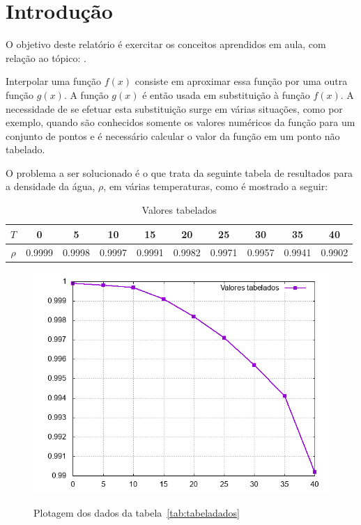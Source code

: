 \documentclass[12pt, hidelinks]{article}
\makeatletter
\let\thetitle\@title
\makeatother
\begin{document}
\section{Introdução}

O objetivo deste relatório é exercitar os conceitos aprendidos em aula, com relação ao tópico: \thetitle.

Interpolar uma função $f(x)$ consiste em aproximar essa função por uma outra função $g(x)$. A função $g(x)$
é então usada em substituição à função $f(x)$.
A necessidade de se efetuar esta substituição surge em várias situações, como por exemplo, quando são
conhecidos somente os valores numéricos da função para um conjunto de pontos e é necessário calcular o
valor da função em um ponto não tabelado.

O problema a ser solucionado é o que trata da seguinte tabela de resultados para a densidade da água, $\rho$, em várias temperaturas, como é mostrado a seguir:
\begin{table}[h]
  \centering
  \begin{tabular}{|c|c|c|c|c|c|c|c|c|c|}
    \hline
      $T$ & 0 & 5 & 10 & 15 & 20 & 25 & 30 & 35 & 40\\
    \hline
      $\rho$ & 0.9999 & 0.9998 & 0.9997 & 0.9991 & 0.9982 & 0.9971 & 0.9957 & 0.9941 & 0.9902\\
    \hline
  \end{tabular}
  \caption{Valores tabelados}
  \label{tab:tabeladados}
\end{table}
\begin{figure}[!h]
  \centering
  \includegraphics[width=12cm]{figuras/graph.png}\\
  \caption{Plotagem dos dados da tabela~\eqref{tab:tabeladados}}\label{fig:graph}
\end{figure}
\end{document}
